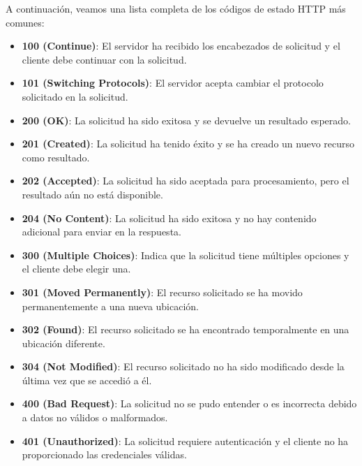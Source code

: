 \documentclass[executivepaper]{article}
\begin{document}
A continuación, veamos una lista completa de los códigos de estado HTTP más comunes:

\begin{itemize}
    \item \textbf{100 (Continue)}: El servidor ha recibido los encabezados de solicitud y el cliente debe continuar con la solicitud.
    
    \item \textbf{101 (Switching Protocols)}: El servidor acepta cambiar el protocolo solicitado en la solicitud.
    
    \item \textbf{200 (OK)}: La solicitud ha sido exitosa y se devuelve un resultado esperado.
    
    \item \textbf{201 (Created)}: La solicitud ha tenido éxito y se ha creado un nuevo recurso como resultado.
    
    \item \textbf{202 (Accepted)}: La solicitud ha sido aceptada para procesamiento, pero el resultado aún no está disponible.
    
    \item \textbf{204 (No Content)}: La solicitud ha sido exitosa y no hay contenido adicional para enviar en la respuesta.
    
    \item \textbf{300 (Multiple Choices)}: Indica que la solicitud tiene múltiples opciones y el cliente debe elegir una.
    
    \item \textbf{301 (Moved Permanently)}: El recurso solicitado se ha movido permanentemente a una nueva ubicación.
    
    \item \textbf{302 (Found)}: El recurso solicitado se ha encontrado temporalmente en una ubicación diferente.
    
    \item \textbf{304 (Not Modified)}: El recurso solicitado no ha sido modificado desde la última vez que se accedió a él.
    
    \item \textbf{400 (Bad Request)}: La solicitud no se pudo entender o es incorrecta debido a datos no válidos o malformados.
    
    \item \textbf{401 (Unauthorized)}: La solicitud requiere autenticación y el cliente no ha proporcionado las credenciales válidas.
    

\end{itemize}
\end{document}
